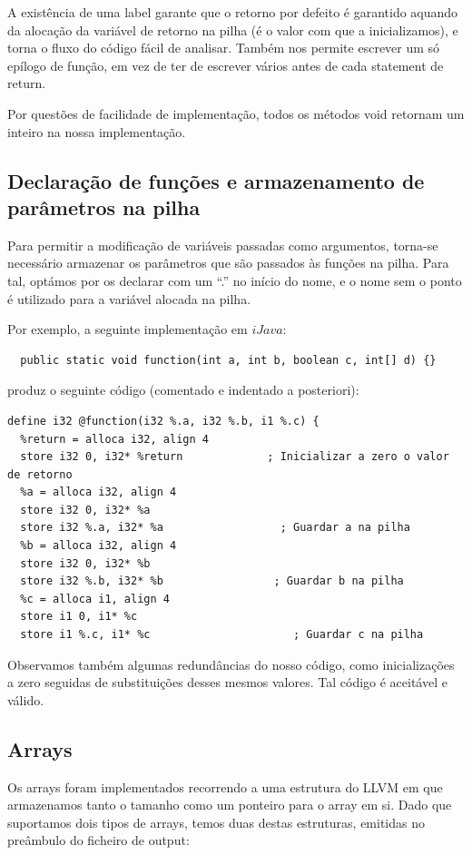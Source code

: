 \documentclass[11pt,a4paper]{article}
\begin{document}
A existência de uma label garante que o retorno por defeito é garantido aquando da alocação da variável de retorno na pilha (é o valor com que a inicializamos), e torna o fluxo do código fácil de analisar. Também nos permite escrever um só epílogo de função, em vez de ter de escrever vários antes de cada statement de return.

Por questões de facilidade de implementação, todos os métodos void retornam um inteiro na nossa implementação.

\subsection{Declaração de funções e armazenamento de parâmetros na pilha}
Para permitir a modificação de variáveis passadas como argumentos, torna-se necessário armazenar os parâmetros que são passados às funções na pilha. Para tal, optámos por os declarar com um ``.'' no início do nome, e o nome sem o ponto é utilizado para a variável alocada na pilha.

Por exemplo, a seguinte implementação em $iJava$:
\begin{lstlisting}
  public static void function(int a, int b, boolean c, int[] d) {}
\end{lstlisting}

produz o seguinte código (comentado e indentado a posteriori):
\begin{lstlisting}
define i32 @function(i32 %.a, i32 %.b, i1 %.c) {
  %return = alloca i32, align 4
  store i32 0, i32* %return             ; Inicializar a zero o valor de retorno
  %a = alloca i32, align 4               
  store i32 0, i32* %a                     
  store i32 %.a, i32* %a                  ; Guardar a na pilha
  %b = alloca i32, align 4
  store i32 0, i32* %b
  store i32 %.b, i32* %b                 ; Guardar b na pilha
  %c = alloca i1, align 4
  store i1 0, i1* %c    
  store i1 %.c, i1* %c                      ; Guardar c na pilha
\end{lstlisting}

Observamos também algumas redundâncias do nosso código, como inicializações a zero seguidas de substituições desses mesmos valores. Tal código é aceitável e válido.

\subsection{Arrays}

Os arrays foram implementados recorrendo a uma estrutura do LLVM em que armazenamos tanto o tamanho como um ponteiro para o array em si. Dado que suportamos dois tipos de arrays, temos duas destas estruturas, emitidas no preâmbulo do ficheiro de output:
\end{document}
